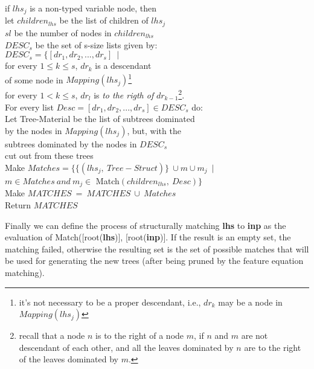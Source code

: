 \begin{tabbing}
\>\>\>\> if $lhs_j$ is a non-typed variable node, then \\

\>\>\>\>\> let \>$children_{lhs}$ be the list of children of $lhs_j$ \\
\>\>\>\>\> \> $sl$ be the number of nodes in $children_{lhs}$ \\

\>\>\>\>\>\> $DESC_s$ be the set of s-size lists given by: \\
\>\>\>\>\>\>\>\> $DESC_s=\{[dr_1,dr_2,...,dr_s]\ \mid\ $ \\
\>\>\>\>\>\>\>\>\>\> for every $1 \leq k \leq s$, $dr_k$ is a descendant \\
\>\>\>\>\>\>\>\>\>\>\>\> of
                        some node in $Mapping(lhs_j)$\footnote{it's not 
                necessary to be a proper descendant,
                i.e., $dr_k$ may be a node in $Mapping(lhs_j)$}\\
\>\>\>\>\>\>\>\>\>\> for every $1 < k \leq s$, $dr_l$ is {\it to the rigth of}
                        $dr_{k-1}$\footnote{recall that a node 
$n$ is to the right of a node $m$, if $n$ and $m$ are not descendant of each
other, and all the leaves dominated by $n$ are to the right of the leaves
dominated by $m$.}.\\

\>\>\>\>\>\> For every list $Desc=[dr_1,dr_2,...,dr_s] \in DESC_s$ do: \\

\>\>\>\>\>\>\> Let Tree-Material be the list of subtrees dominated \\
\>\>\>\>\>\>\>\>\> by the nodes in $Mapping(lhs_j)$, but, with the \\
\>\>\>\>\>\>\>\>\> subtrees dominated by the nodes in $DESC_s$ \\
\>\>\>\>\>\>\>\>\> cut out from these trees \\

\>\>\>\>\>\>\> Make $Matches=\{\{(lhs_j,\ Tree-Struct)\}\ \cup 
        m\cup m_j\ \mid$ \\
\>\>\>\>\>\>\>\>\> $m\in Matches\ and\ 
        m_j\in$ Match$(children_{lhs},\ Desc)\}$ \\ 

\>\>\> Make $MATCHES\ =\ MATCHES\ \cup\ Matches$ \\

\>\> Return $MATCHES$

\end{tabbing}

Finally we can define the process of structurally matching {\bf lhs} to
{\bf inp} as the evaluation of Match([root({\bf lhs})], [root({\bf inp})].
If the result is an empty set, the matching failed, otherwise the resulting
set is the set of possible matches that will be used for generating the
new trees (after being pruned by the feature equation matching).

